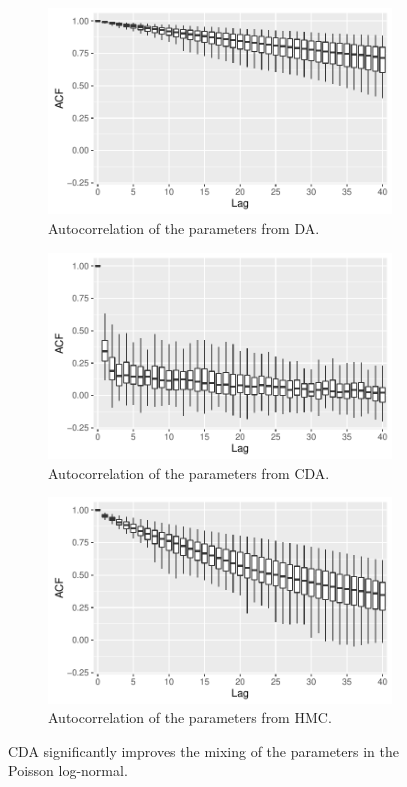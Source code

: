 \documentclass[12pt]{article}
\begin{document}
 \begin{figure}[H]
  \begin{subfigure}[b]{0.32\textwidth}
 \includegraphics[width=1\textwidth]{poisson_acf_da}
 \caption{Autocorrelation of the parameters from DA.}
 \end{subfigure}
  \hfill 
 \begin{subfigure}[b]{0.32\textwidth}
 \includegraphics[width=1\textwidth]{poisson_acf_cda}
 \caption{Autocorrelation of the parameters from CDA.}
 \end{subfigure}  \hfill 
 \begin{subfigure}[b]{0.32\textwidth}
 \includegraphics[width=1\textwidth]{poisson_acf_hmc}
 \caption{Autocorrelation of the parameters from HMC.}
 \end{subfigure}
 \caption{CDA significantly improves the mixing of the parameters in the Poisson log-normal.}
 \label{data_poisson}
 \end{figure}
\end{document}
